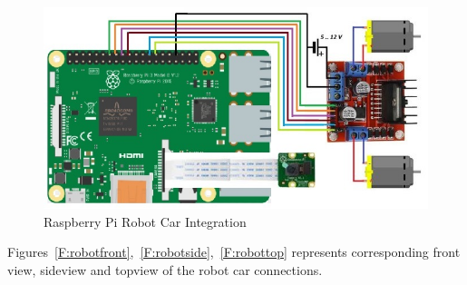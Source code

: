 \begin{figure}[htb]
  \includegraphics[width=1.0\columnwidth]{images/RaspPi_Robot.jpg}
  \caption{Raspberry Pi Robot Car Integration}\label{F:circuit}
\end{figure}

Figures~\ref{F:robotfront},~\ref{F:robotside},~\ref{F:robottop}  represents 
corresponding front view, sideview and topview of the robot car connections.

